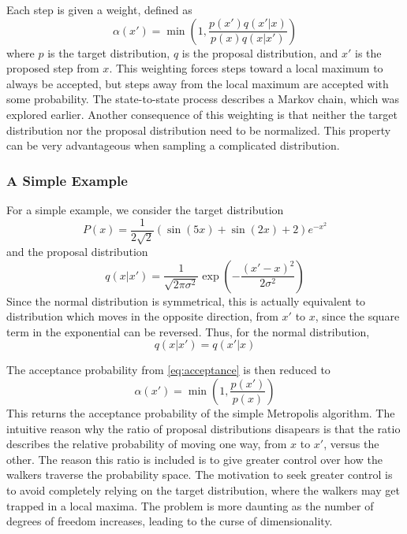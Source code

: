 \documentclass[twocolumn]{article}
\begin{document}
Each step is given a weight, defined as
\begin{equation}
  \alpha(x') = \min \left( 1, \frac{p(x') q(x' | x)}{p(x) q(x | x')} \right)
  \label{eq:acceptance}
\end{equation}
where $p$ is the target distribution, $q$ is the proposal distribution, and $x'$
is the proposed step from $x$. This weighting forces steps toward a local
maximum to always be accepted, but steps away from the local maximum are
accepted with some probability. The state-to-state process describes a Markov
chain, which was explored earlier. Another consequence of this weighting is that
neither the target distribution nor the proposal distribution need to be
normalized. This property can be very advantageous when sampling a complicated
distribution.

\subsubsection{A Simple Example}
For a simple example, we consider the target distribution
\begin{equation}
  P(x) = \frac{1}{2 \sqrt{2}} \left( \sin(5x) + \sin(2x) + 2 \right) e^{-x^2}
  \label{eq:example}
\end{equation}
and the proposal distribution
\begin{equation}
  q(x | x') = \frac{1}{\sqrt{2 \pi \sigma^2}} \exp \left( - \frac{(x' - x)^2}{2 \sigma^2} \right)
\end{equation}
Since the normal distribution is symmetrical, this is actually equivalent to
distribution which moves in the opposite direction, from $x'$ to $x$, since the
square term in the exponential can be reversed. Thus, for the normal
distribution,
\begin{equation}
  q(x | x') = q(x' | x)
\end{equation}

The acceptance probability from \ref{eq:acceptance} is then reduced to
\begin{equation}
  \alpha(x') = \min \left( 1, \frac{p(x')}{p(x)} \right)
\end{equation}
This returns the acceptance probability of the simple Metropolis algorithm. The
intuitive reason why the ratio of proposal distributions disapears is that the
ratio describes the relative probability of moving one way, from $x$ to $x'$,
versus the other. The reason this ratio is included is to give greater control
over how the walkers traverse the probability space. The motivation to seek
greater control is to avoid completely relying on the target distribution, where
the walkers may get trapped in a local maxima. The problem is more daunting as
the number of degrees of freedom increases, leading to the curse of
dimensionality.
\end{document}
